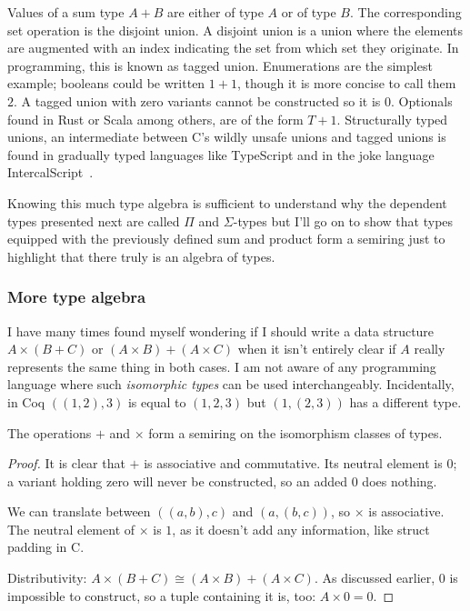 \documentclass[english, 12pt, a4paper, sci, a-1b, online]{aaltothesis}
\begin{document}
Values of a sum type $A + B$ are either of type $A$ or of type $B$. The corresponding set operation is the disjoint union. A disjoint union is a union where the elements are augmented with an index indicating the set from which set they originate. In programming, this is known as tagged union. Enumerations are the simplest example; booleans could be written $1 + 1$, though it is more concise to call them $2$. A tagged union with zero variants cannot be constructed so it is $0$. Optionals found in Rust or Scala among others, are of the form $T + 1$. Structurally typed unions, an intermediate between C's wildly unsafe unions and tagged unions is found in gradually typed languages like TypeScript and in the joke language IntercalScript~\cite{ICS}.

Knowing this much type algebra is sufficient to understand why the dependent types presented next are called $\Pi$ and $\Sigma$-types but I'll go on to show that types equipped with the previously defined sum and product form a semiring just to highlight that there truly is an algebra of types.

\subsubsection{More type algebra}

I have many times found myself wondering if I should write a data structure $A \times (B + C)$ or $(A \times B) + (A \times C)$ when it isn't entirely clear if $A$ really represents the same thing in both cases. I am not aware of any programming language where such \emph{isomorphic types} can be used interchangeably. Incidentally, in Coq $((1, 2), 3)$ is equal to $(1, 2, 3)$ but $(1, (2, 3))$ has a different type.

\begin{theorem}
  The operations $+$ and $\times$ form a semiring on the isomorphism classes of types.
\end{theorem}

\begin{proof}
  It is clear that $+$ is associative and commutative. Its neutral element is $0$; a variant holding zero will never be constructed, so an added $0$ does nothing.

  We can translate between $((a, b), c)$ and $(a, (b, c))$, so $\times$ is associative. The neutral element of $\times$ is $1$, as it doesn't add any information, like struct padding in C.

  Distributivity: $A \times (B + C) \cong (A \times B) + (A \times C)$. As discussed earlier, $0$ is impossible to construct, so a tuple containing it is, too: $A \times 0 = 0$.
\end{proof}
\end{document}
